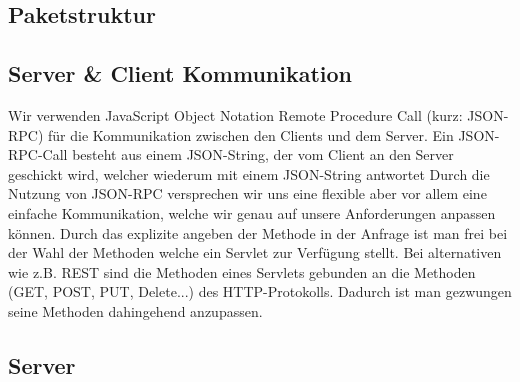 	\subsection{Paketstruktur}
	\begin {center}
\end {center}
	\subsection{Server \& Client Kommunikation}

	Wir verwenden JavaScript Object Notation Remote Procedure Call (kurz: JSON-RPC) für die Kommunikation zwischen den Clients und dem Server.
	Ein JSON-RPC-Call besteht aus einem JSON-String, der vom Client an den Server geschickt wird, welcher wiederum mit einem JSON-String antwortet
	Durch die Nutzung von JSON-RPC versprechen wir uns eine flexible aber vor allem eine einfache Kommunikation, welche wir genau auf unsere Anforderungen anpassen können.
Durch das explizite angeben der Methode in der Anfrage ist man frei bei der Wahl der Methoden welche ein Servlet zur Verfügung stellt. Bei alternativen wie z.B. REST sind die Methoden eines Servlets gebunden an die Methoden (GET, POST, PUT, Delete...) des HTTP-Protokolls. Dadurch ist man gezwungen seine Methoden dahingehend anzupassen.

	
	\subsection{Server}
